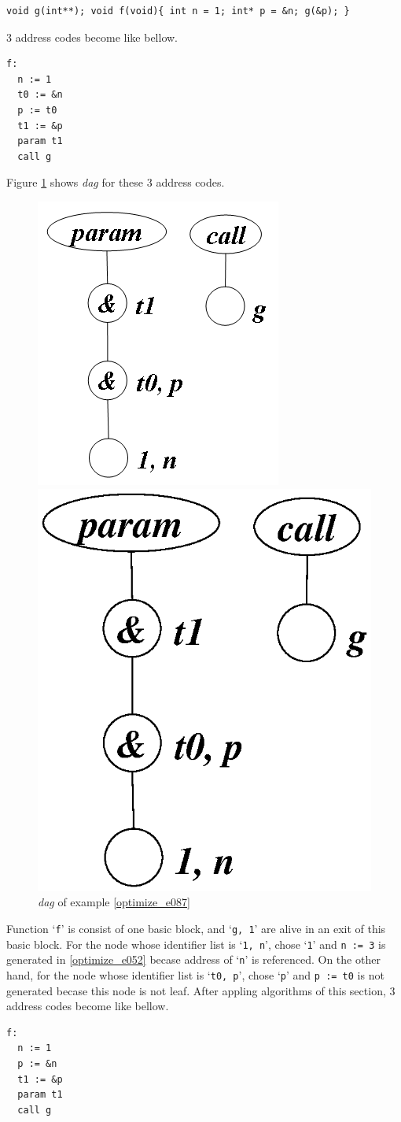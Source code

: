 \begin{Example}
\label{optimize_e087}
\begin{verbatim}
void g(int**); void f(void){ int n = 1; int* p = &n; g(&p); }
\end{verbatim}
3 address codes become like bellow.
\begin{verbatim}
f:
  n := 1
  t0 := &n
  p := t0
  t1 := &p
  param t1
  call g
\end{verbatim}
Figure \ref{optimize_e088} shows {\em dag} for these 3 address codes.
\begin{figure}[htbp]
\begin{center}
\begin{htmlonly}
\includegraphics[width=0.392\linewidth,height=0.5\linewidth]{opt037.png}
\end{htmlonly}
\begin{latexonly}
\includegraphics[width=0.392\linewidth,height=0.5\linewidth]{opt037.eps}
\end{latexonly}
\caption{{\em dag} of example \ref{optimize_e087}}
\label{optimize_e088}
\end{center}
\end{figure}
Function `{\tt{f}}' is consist of one basic block,
and `{\tt{g, 1}}' are alive in an exit of this basic block.
For the node whose identifier list is `{\tt{1, n}}',
chose `{\tt{1}}' and {\tt{n := 3}} is generated in 
\ref{optimize_e052} becase address of `{\tt{n}}' is referenced.
On the other hand, for
the node whose identifier list is `{\tt{t0, p}}',
chose `{\tt{p}}' and {\tt{p := t0}} is not generated
becase this node is not leaf.
After appling algorithms of this section,
3 address codes become like bellow.
\begin{verbatim}
f:
  n := 1
  p := &n
  t1 := &p
  param t1
  call g
\end{verbatim}
\end{Example}

